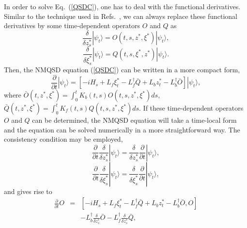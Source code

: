 \documentclass[preprint]{elsarticle}
\begin{document}
In order to solve  Eq.~(\ref{QSDC}), one has to deal with the functional
derivatives. Similar to the technique used in Refs.~\cite{Yu1999,ShiFB,ZhaoFB,ChenFB},
we can always replace these functional derivatives by some time-dependent
operators $O$ and $Q$ as
\begin{equation}
\frac{\delta}{\delta z_{s}^{*}}|\psi_{t}\rangle=O(t,s,z^{*},\xi^{*})|\psi_{t}\rangle,
\end{equation}
\begin{equation}
\frac{\delta}{\delta\xi_{s}^{*}}|\psi_{t}\rangle=Q(t,s,\xi^{*},z^{*})|\psi_{t}\rangle.
\end{equation}
Then, the NMQSD equation (\ref{QSDC}) can be written in a more compact
form,
\begin{equation}
\frac{\partial}{\partial t}|\psi_{t}\rangle=[-iH_{s}+L_{f}\xi_{t}^{\ast}-L_{f}^{\dagger}\bar{Q}+L_{b}z_{t}^{*}-L_{b}^{\dagger}\bar{O}]|\psi_{t}\rangle,\label{QSDC2}
\end{equation}
where $\bar{O}(t,z^{*},\xi^{*})=\int_{0}^{t}K_{b}(t,s)O(t,s,z^{*},\xi^{*})ds$,
$\bar{Q}(t,z^{*},\xi^{*})=\int_{0}^{t}K_{f}(t,s)Q(t,s,z^{*},\xi^{*})ds$.
If these time-dependent operators $O$ and $Q$ can be determined,
the NMQSD equation will take a time-local form and the equation can be solved
numerically in a more straightforward way. The consistency 
condition may be employed,
\begin{equation}
\frac{\partial}{\partial t}\frac{\delta}{\delta z_{s}^{*}}|\psi_{t}\rangle=\frac{\delta}{\delta z_{s}^{*}}\frac{\partial}{\partial t}|\psi_{t}\rangle,
\end{equation}
\begin{equation}
\frac{\partial}{\partial t}\frac{\delta}{\delta\xi_{s}^{*}}|\psi_{t}\rangle=\frac{\delta}{\delta\xi_{s}^{*}}\frac{\partial}{\partial t}|\psi_{t}\rangle,
\end{equation}
and gives rise to
\begin{eqnarray}
\frac{\partial}{\partial t}O & = & [-iH_{s}+L_{f}\xi_{t}^{\ast}-L_{f}^{\dagger}\bar{Q}+L_{b}z_{t}^{*}-L_{b}^{\dagger}\bar{O},O]\nonumber \\
 &  & -L_{b}^{\dagger}\frac{\delta}{\delta z_{s}^{*}}\bar{O}-L_{f}^{\dagger}\frac{\delta}{\delta z_{s}^{*}}\bar{Q}, \label{EqO}
\end{eqnarray}
\end{document}
